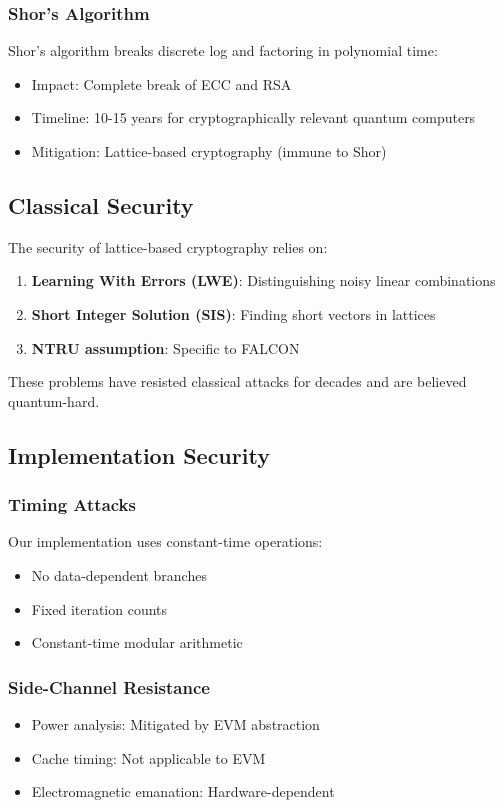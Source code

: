 \documentclass[11pt,a4paper]{article}
\begin{document}
\subsubsection{Shor's Algorithm}
Shor's algorithm breaks discrete log and factoring in polynomial time:
\begin{itemize}
\item Impact: Complete break of ECC and RSA
\item Timeline: 10-15 years for cryptographically relevant quantum computers
\item Mitigation: Lattice-based cryptography (immune to Shor)
\end{itemize}

\subsection{Classical Security}

The security of lattice-based cryptography relies on:

\begin{enumerate}
\item \textbf{Learning With Errors (LWE)}: Distinguishing noisy linear combinations
\item \textbf{Short Integer Solution (SIS)}: Finding short vectors in lattices
\item \textbf{NTRU assumption}: Specific to FALCON
\end{enumerate}

These problems have resisted classical attacks for decades and are believed quantum-hard.

\subsection{Implementation Security}

\subsubsection{Timing Attacks}
Our implementation uses constant-time operations:
\begin{itemize}
\item No data-dependent branches
\item Fixed iteration counts
\item Constant-time modular arithmetic
\end{itemize}

\subsubsection{Side-Channel Resistance}
\begin{itemize}
\item Power analysis: Mitigated by EVM abstraction
\item Cache timing: Not applicable to EVM
\item Electromagnetic emanation: Hardware-dependent
\end{itemize}
\end{document}
